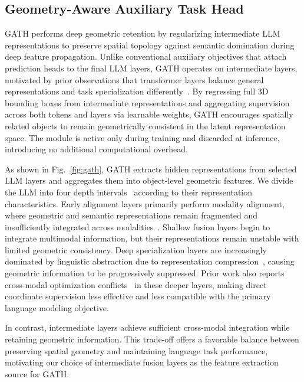 \documentclass[lettersize,journal]{IEEEtran}
\begin{document}
\subsection{Geometry-Aware Auxiliary Task Head}

GATH performs deep geometric retention by regularizing intermediate LLM representations to preserve spatial topology against semantic domination during deep feature propagation. Unlike conventional auxiliary objectives that attach prediction heads to the final LLM layers, GATH operates on intermediate layers, motivated by prior observations that transformer layers balance general representations and task specialization differently~\cite{liu2019linguistic,voita2019bottom}. By regressing full 3D bounding boxes from intermediate representations and aggregating supervision across both tokens and layers via learnable weights, GATH encourages spatially related objects to remain geometrically consistent in the latent representation space. The module is active only during training and discarded at inference, introducing no additional computational overhead.

As shown in Fig.~\ref{fig:gath}, GATH extracts hidden representations from selected LLM layers and aggregates them into object-level geometric features. We divide the LLM into four depth intervals~\cite{yu&lee2025} according to their representation characteristics. Early alignment layers primarily perform modality alignment, where geometric and semantic representations remain fragmented and insufficiently integrated across modalities~\cite{chang2026}. Shallow fusion layers begin to integrate multimodal information, but their representations remain unstable with limited geometric consistency. Deep specialization layers are increasingly dominated by linguistic abstraction due to representation compression~\cite{chang2026}, causing geometric information to be progressively suppressed. Prior work also reports cross-modal optimization conflicts~\cite{hao2026} in these deeper layers, making direct coordinate supervision less effective and less compatible with the primary language modeling objective.

In contrast, intermediate layers achieve sufficient cross-modal integration while retaining geometric information. This trade-off offers a favorable balance between preserving spatial geometry and maintaining language task performance, motivating our choice of intermediate {fusion} layers as the feature extraction source for GATH.


\end{document}
